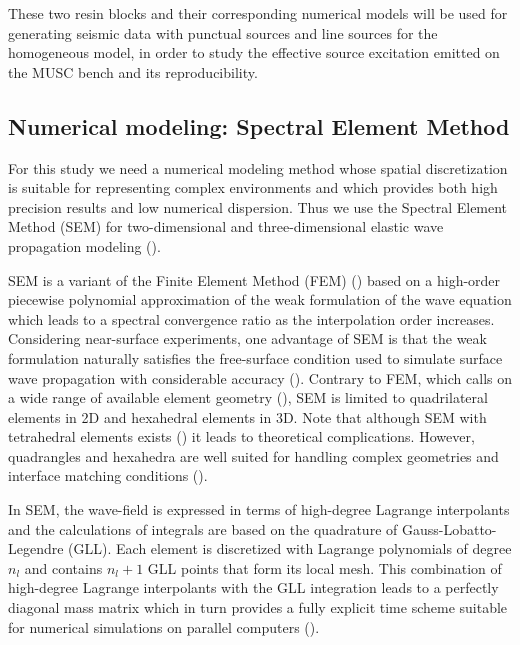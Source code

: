 \documentclass[extra,mreferee]{gji}
\newcommand{\bialt}{\textit{BiAlt} }
\begin{document}

These two resin blocks and their corresponding numerical models will be used for generating seismic data with punctual sources and line sources for the homogeneous model, in order to study the effective source excitation emitted on the MUSC bench and its reproducibility.

\subsection{Numerical modeling: Spectral Element Method}

For this study we need a numerical modeling method whose spatial discretization is suitable for representing complex environments and which provides both high precision results and low numerical dispersion. Thus we use the Spectral Element Method (SEM) for two-dimensional and three-dimensional elastic wave propagation modeling (\cite{komatitsch1998spectral,komatitsch1999spectral,komatitsch2005spectral,Festa_PML_2005}). 

SEM is a variant of the Finite Element Method (FEM) (\cite{Lysmer_FEM_1972,Seron_FEM_1990,Hulbert_FEM_1990,Tromp_SEM_2008}) based on a high-order piecewise polynomial approximation of the weak formulation of the wave equation which leads to a spectral convergence ratio as the interpolation order increases. Considering near-surface experiments, one advantage of SEM is that the weak formulation naturally satisfies the free-surface condition used to simulate surface wave propagation with considerable accuracy (\cite{komatitsch1998spectral,komatitsch1999spectral,komatitsch2005spectral}). Contrary to FEM, which calls on a wide range of available element geometry (\cite{dhatt1984finite}), SEM is limited to quadrilateral elements in 2D and hexahedral elements in 3D. Note that although SEM with tetrahedral elements exists (\cite{komatitsch2001wave}) it leads to theoretical complications. However, quadrangles and hexahedra are well suited for handling complex geometries and interface matching conditions (\cite{Cristini_SEM_2012}). 

In SEM, the wave-field is expressed in terms of high-degree Lagrange interpolants and the calculations of integrals are based on the quadrature of Gauss-Lobatto-Legendre (GLL). Each element is discretized with Lagrange polynomials of degree $n_{l}$ and contains $n_{l}+1$ GLL points that form its local mesh. This combination of high-degree Lagrange interpolants with the GLL integration leads to a perfectly diagonal mass matrix which in turn provides a fully explicit time scheme suitable for numerical simulations on parallel computers (\cite{komatitsch1998spectral,komatitsch1999spectral}).
\end{document}
